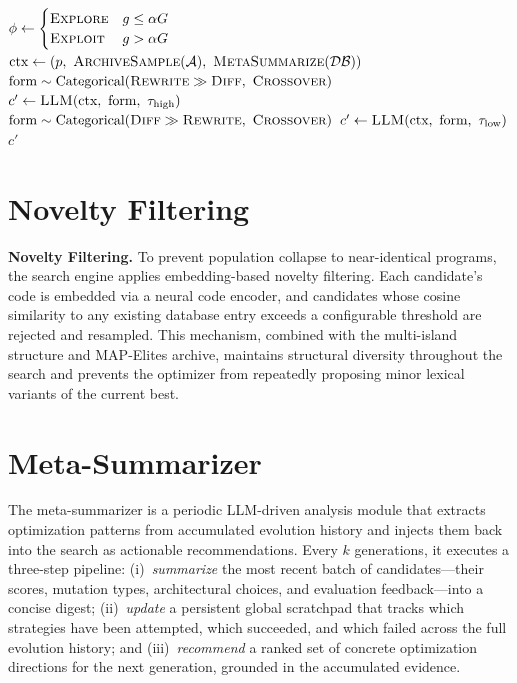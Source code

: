 \begin{algorithm}[H]
\caption{\textsc{LLMMutate}: Phase-Dependent Variation Operator}
\label{alg:llmmutate_appendix}
\begin{algorithmic}[1]
\setlength{\itemsep}{0pt}
\setlength{\parskip}{0pt}
\State $\phi \gets \begin{cases} \textsc{Explore} & g \leq \alpha G \\ \textsc{Exploit} & g > \alpha G \end{cases}$
\State $\text{ctx} \gets (p,\ \textsc{ArchiveSample}(\mathcal{A}),\ \textsc{MetaSummarize}(\mathcal{DB}))$
    \State $\text{form} \sim \text{Categorical}(\textsc{Rewrite} \gg \textsc{Diff},\ \textsc{Crossover})$
    \State $c' \gets \textsc{LLM}(\text{ctx},\ \text{form},\ \tau_{\text{high}})$
\Else
    \State $\text{form} \sim \text{Categorical}(\textsc{Diff} \gg \textsc{Rewrite},\ \textsc{Crossover})$
    \State $c' \gets \textsc{LLM}(\text{ctx},\ \text{form},\ \tau_{\text{low}})$
\EndIf
\State \Return $c'$
\end{algorithmic}
\end{algorithm}

\section{Novelty Filtering}
\noindent\textbf{Novelty Filtering.}
To prevent population collapse to near-identical programs, the search engine applies embedding-based novelty filtering. Each candidate's code is embedded via a neural code encoder, and candidates whose cosine similarity to any existing database entry exceeds a configurable threshold are rejected and resampled. This mechanism, combined with the multi-island structure and MAP-Elites archive, maintains structural diversity throughout the search and prevents the optimizer from repeatedly proposing minor lexical variants of the current best.

\section{Meta-Summarizer}\label{sec:meta}

The meta-summarizer is a periodic LLM-driven analysis module that extracts optimization patterns from accumulated evolution history and injects them back into the search as actionable recommendations. Every $k$ generations, it executes a three-step pipeline: (i)~\emph{summarize} the most recent batch of candidates---their scores, mutation types, architectural choices, and evaluation feedback---into a concise digest; (ii)~\emph{update} a persistent global scratchpad that tracks which strategies have been attempted, which succeeded, and which failed across the full evolution history; and (iii)~\emph{recommend} a ranked set of concrete optimization directions for the next generation, grounded in the accumulated evidence.

